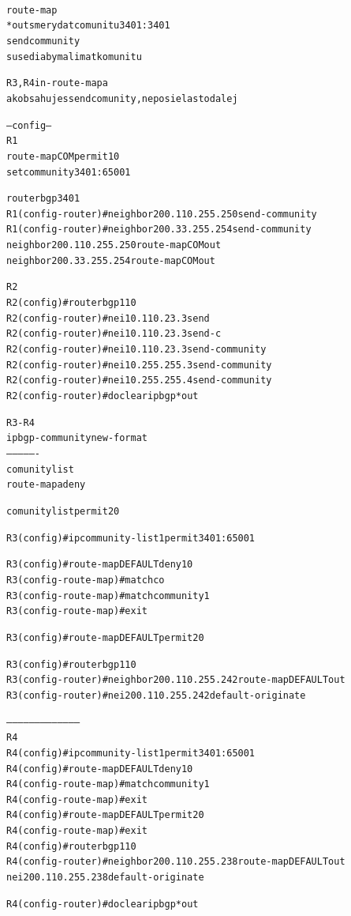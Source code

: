 \documentclass[12pt,twoside,a4paper]{report}
\begin{document}
\paragraph{}

\noindent
{\selectfont
\begin{small}
\begin{alltt}
route-map
* out smery dat comunitu 3401:3401
send community
susedia by mali mat komunitu

R3,R4 in - route-mapa
ak obsahujes send comunity, neposielas to dalej

---config---
R1
route-map COM permit 10
 set community 3401:65001

router bgp 3401
R1(config-router)# neighbor 200.110.255.250 send-community
R1(config-router)# neighbor 200.33.255.254 send-community
 neighbor 200.110.255.250 route-map COM out
 neighbor 200.33.255.254 route-map COM out

R2
R2(config)#router bgp 110
R2(config-router)#nei 10.110.23.3 send
R2(config-router)#nei 10.110.23.3 send-c
R2(config-router)#nei 10.110.23.3 send-community
R2(config-router)#nei 10.255.255.3 send-community
R2(config-router)#nei 10.255.255.4 send-community
R2(config-router)#do clear ip bgp * out

R3-R4
ip bgp-community new-format
----------------
comunity list
route-mapa deny

comunity list permit 20

R3(config)#ip community-list 1 permit 3401:65001

R3(config)#route-map DEFAULT deny 10
R3(config-route-map)#match co
R3(config-route-map)#match community 1
R3(config-route-map)#exit

R3(config)#route-map DEFAULT permit 20

R3(config)#router bgp 110
R3(config-router)#neighbor 200.110.255.242 route-map DEFAULT out
R3(config-router)#nei 200.110.255.242 default-originate

---------------------------------------
R4
R4(config)#ip community-list 1 permit 3401:65001
R4(config)#route-map DEFAULT deny 10
R4(config-route-map)#match community 1
R4(config-route-map)#exit
R4(config)#route-map DEFAULT permit 20
R4(config-route-map)#exit
R4(config)#router bgp 110
R4(config-router)#neighbor 200.110.255.238 route-map DEFAULT out
 nei 200.110.255.238 default-originate

R4(config-router)#do clear ip bgp * out
\end{alltt}
\end{small}
}
\end{document}
